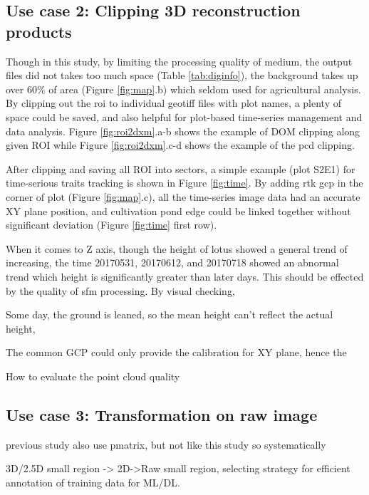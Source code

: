 \documentclass{configs/bmcart}
\begin{document}
\subsection*{Use case 2: Clipping 3D reconstruction products}
Though in this study, by limiting the processing quality of medium, the output files did not takes too much space (Table \ref{tab:diginfo}), the  background takes up over 60\% of area (Figure \ref{fig:map}.b) which seldom used for agricultural analysis. By clipping out the \acrfull*{roi} to individual geotiff files with plot names, a plenty of space could be saved, and also helpful for plot-based time-series management and data analysis. Figure \ref{fig:roi2dxm}.a-b shows the example of DOM clipping along given ROI while Figure \ref{fig:roi2dxm}.c-d shows the example of the \acrfull*{pcd} clipping.

After clipping and saving all ROI into sectors, a simple example (plot S2E1) for time-serious traits tracking is shown in Figure \ref{fig:time}. By adding \acrfull*{rtk} \acrfull*{gcp} in the corner of plot (Figure \ref{fig:map}.c), all the time-series image data had an accurate XY plane position, and cultivation pond edge could be linked together without significant deviation (Figure \ref{fig:time} first row). 

When it comes to Z axis, though the height of lotus showed a general trend of increasing, the time 20170531, 20170612, and 20170718 showed an abnormal trend which height is significantly greater than later days. This should be effected by the quality of \acrfull*{sfm} processing. By visual checking, 

Some day, the ground is leaned, so the mean height can't reflect the actual height,

The common GCP could only provide the calibration for XY plane, hence the 


How to evaluate the point cloud quality

\subsection*{Use case 3: Transformation on raw image}
previous study also use pmatrix, but not like this study so systematically


3D/2.5D small region -> 2D->Raw small region, selecting strategy for efficient annotation of training data for ML/DL.
\end{document}
